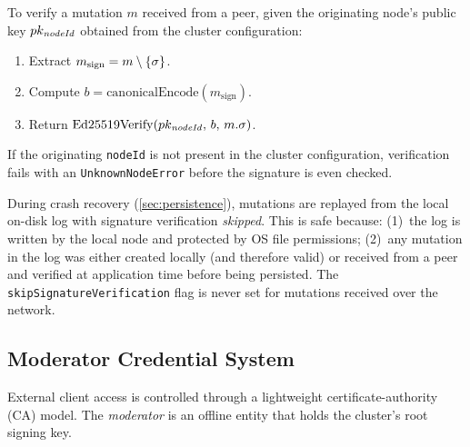 \begin{protocol}
\label{proto:verify-mut}
To verify a mutation $m$ received from a peer, given the originating node's
public key $pk_{\mathit{nodeId}}$ obtained from the cluster configuration:
\begin{enumerate}[leftmargin=1.5em]
  \item Extract $m_{\text{sign}} = m \setminus \{\sigma\}$.
  \item Compute $b = \mathrm{canonicalEncode}(m_{\text{sign}})$.
  \item Return $\mathrm{Ed25519Verify}(pk_{\mathit{nodeId}},\, b,\, m.\sigma)$.
\end{enumerate}
If the originating \texttt{nodeId} is not present in the cluster configuration,
verification fails with an \texttt{UnknownNodeError} before the signature is
even checked.
\end{protocol}

\begin{remark}
During crash recovery (\cref{sec:persistence}), mutations are replayed from the
local on-disk log with signature verification \emph{skipped}. This is safe
because:
(1)~the log is written by the local node and protected by OS file permissions;
(2)~any mutation in the log was either created locally (and therefore valid) or
received from a peer and verified at application time before being persisted.
The \texttt{skipSignatureVerification} flag is never set for mutations received
over the network.
\end{remark}

\subsection{Moderator Credential System}

External client access is controlled through a lightweight certificate-authority
(CA) model. The \emph{moderator} is an offline entity that holds the cluster's
root signing key.

